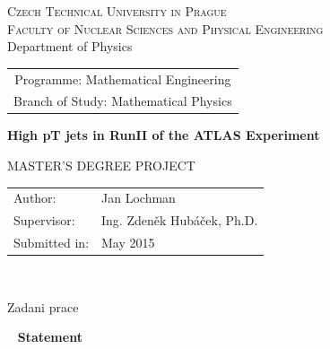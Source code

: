 \documentclass[a4paper,11pt]{report}
\newcommand{\cvut}{Czech Technical University in Prague}
\newcommand{\fjfi}{Faculty of Nuclear Sciences and Physical Engineering}
\newcommand{\km}{Department of Physics}
\newcommand{\obor}{Mathematical Engineering}
\newcommand{\zamereni}{Mathematical Physics}
\newcommand{\nazeven}{High pT jets in RunII of the ATLAS Experiment}
\newcommand{\autor}{Jan Lochman}
\newcommand{\rok}{May 2015}
\newcommand{\vedouci}{Ing. Zden\v{e}k Hub\'{a}\v{c}ek, Ph.D.}
\begin{document}
\thispagestyle{empty}

\begin{center}
    {\Large \textsc{\cvut}\\[1.5ex] \textsc{\fjfi}}\\[1.5ex]{\large \textsc \km}
    \vspace{10mm}

    \begin{tabular}{c}
    {Programme: \obor}\\
    {Branch of Study: \zamereni}
    \end{tabular}

    \vspace{10mm} \epsfysize=25mm  \epsfysize=25mm  \vspace{15mm}

   {\huge \bf \nazeven}

   \vspace{15mm}
   {\Large MASTER'S DEGREE PROJECT}

   \vfill
   {\large
    \begin{tabular}{ll}
    Author: & \autor\\
    Supervisor: & \vedouci\\
    Submitted in: & \rok
    \end{tabular}
   }
\end{center}


\newpage  
\thispagestyle{empty} 
~


\newpage  
\thispagestyle{empty} 
Zadani prace


\newpage 
\thispagestyle{empty}  
~
\vfill 
{\bf Statement} 
\end{document}
